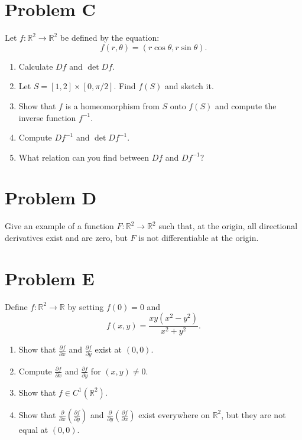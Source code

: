 \documentclass[lang=en,11pt]{template}
\begin{document}
\section*{Problem C}
Let \( f : \mathbb{R}^2 \to \mathbb{R}^2 \) be defined by the equation:
\[
f(r, \theta) = (r \cos \theta, r \sin \theta).
\]
\begin{enumerate}
    \item Calculate \( Df \) and \( \det Df \).
    \item Let \( S = [1, 2] \times [0, \pi/2] \). Find \( f(S) \) and sketch it.
    \item Show that \( f \) is a homeomorphism from \( S \) onto \( f(S) \) and compute the inverse function \( f^{-1} \).
    \item Compute \( Df^{-1} \) and \( \det Df^{-1} \).
    \item What relation can you find between \( Df \) and \( Df^{-1} \)?
\end{enumerate}

\section*{Problem D}
Give an example of a function \( F : \mathbb{R}^2 \to \mathbb{R}^2 \) such that, at the origin, all directional derivatives exist and are zero, but \( F \) is not differentiable at the origin.

\section*{Problem E}
Define \( f : \mathbb{R}^2 \to \mathbb{R} \) by setting \( f(0) = 0 \) and
\[
f(x, y) = \frac{xy(x^2 - y^2)}{x^2 + y^2}.
\]
\begin{enumerate}
    \item Show that \( \frac{\partial f}{\partial x} \) and \( \frac{\partial f}{\partial y} \) exist at \( (0, 0) \).
    \item Compute \( \frac{\partial f}{\partial x} \) and \( \frac{\partial f}{\partial y} \) for \( (x, y) \neq 0 \).
    \item Show that \( f \in C^1(\mathbb{R}^2) \).
    \item Show that \( \frac{\partial}{\partial x} \left( \frac{\partial f}{\partial y} \right) \) and \( \frac{\partial}{\partial y} \left( \frac{\partial f}{\partial x} \right) \) exist everywhere on \( \mathbb{R}^2 \), but they are not equal at \( (0, 0) \).
\end{enumerate}
\end{document}
